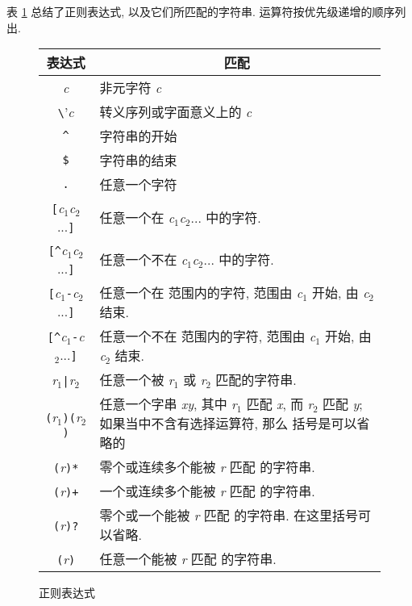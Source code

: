 表 \ref{tbl:regular_expressions} 总结了正则表达式, 以及它们所匹配的字符串.
运算符按优先级递增的顺序列出.
\begin{figure}[ht]
\captionsetup{type=table}
\caption{正则表达式}
\label{tbl:regular_expressions}
\begin{center}
\begin{tabular}{c|p{25em}}
    \hline
    \hline
    表达式  & \multicolumn{1}{c}{匹配}  \\
    \hline
    \textit{c}  & 非元字符 \textit{c}   \\
    \verb'\'\textit{c}   & 转义序列或字面意义上的 \textit{c} \\
    \verb'^'    & 字符串的开始 \\
    \verb'$'    & 字符串的结束  \\
    \verb'.'    & 任意一个字符 \\
    \verb'['\textit{c}$_1$\textit{c}$_2$...\verb']' & 任意一个在
        \textit{c}$_1$\textit{c}$_2$... 中的字符. \\
    \verb'[^'\textit{c}$_1$\textit{c}$_2$...\verb']'    & 任意一个不在
        \textit{c}$_1$\textit{c}$_2$... 中的字符. \\
    \verb'['\textit{c}$_1$\verb'-'\textit{c}$_2$...\verb']' & 任意一个在
        范围内的字符, 范围由 \textit{c}$_1$ 开始, 由 \textit{c}$_2$ 结束.
        \\
\verb'[^'\textit{c}$_1$\verb'-'\textit{c}$_2$...\verb']' & 任意一个不在
        范围内的字符, 范围由 \textit{c}$_1$ 开始,
        由 \textit{c}$_2$ 结束.  \\
    \textit{r}$_1$\verb'|'\textit{r}$_2$    & 任意一个被 \textit{r}$_1$
        或 \textit{r}$_2$ 匹配的字符串. \\
     \verb'('\textit{r}$_1$\verb')('\textit{r}$_2$\verb')'    &
         任意一个字串 \textit{xy}, 其中 \textit{r}$_1$ 匹配 \textit{x},
         而 \textit{r}$_2$ 匹配 \textit{y};
         如果当中不含有选择运算符, 那么
         括号是可以省略的 \\
     \verb'('\textit{r}\verb')*' & 零个或连续多个能被 \textit{r} 匹配
         的字符串. \\
     \verb'('\textit{r}\verb')+' & 一个或连续多个能被 \textit{r} 匹配
         的字符串. \\
     \verb'('\textit{r}\verb')?' & 零个或一个能被 \textit{r} 匹配
         的字符串. 在这里括号可以省略. \\
     \verb'('\textit{r}\verb')' & 任意一个能被 \textit{r} 匹配
         的字符串. \\
     \hline
\end{tabular}
\end{center}
\end{figure}

